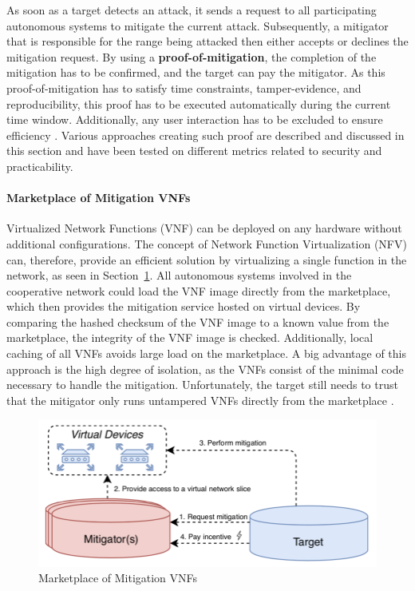 As soon as a target detects an attack, it sends a request to all participating autonomous systems to mitigate the current attack. Subsequently, a mitigator that is responsible for the range being attacked then either accepts or declines the mitigation request. By using a \textbf{proof-of-mitigation}, the completion of the mitigation has to be confirmed, and the target can pay the mitigator. As this proof-of-mitigation has to satisfy time constraints, tamper-evidence, and reproducibility, this proof has to be executed automatically during the current time window. Additionally, any user interaction has to be excluded to ensure efficiency \cite{Mannhart2018}. Various approaches creating such proof are described and discussed in this section and have been tested on different metrics related to security and practicability.

\paragraph{Marketplace of Mitigation VNFs}
Virtualized  Network Functions (VNF) can be deployed on any hardware without additional configurations. The concept of Network Function Virtualization (NFV) can, therefore, provide an efficient solution by virtualizing a single function in the network, as seen in Section~\ref{ddos_marketplace_vnf}. All autonomous systems involved in the cooperative network could load the VNF image directly from the marketplace, which then provides the mitigation service hosted on virtual devices. By comparing the hashed checksum of the VNF image to a known value from the marketplace, the integrity of the VNF image is checked. Additionally, local caching of all VNFs avoids large load on the marketplace. A big advantage of this approach is the high degree of isolation, as the VNFs consist of the minimal code necessary to handle the mitigation. Unfortunately, the target still needs to trust that the mitigator only runs untampered VNFs directly from the marketplace \cite{Mannhart2018}.
\begin{figure}[ht]
  \begin{center}
    \includegraphics[scale=0.5]{Talk7/img/ddos/cooperative_network_marketplace_vnfs}
  \end{center}
  \caption{Marketplace of Mitigation VNFs}
  \label{ddos_marketplace_vnf}
\end{figure}

